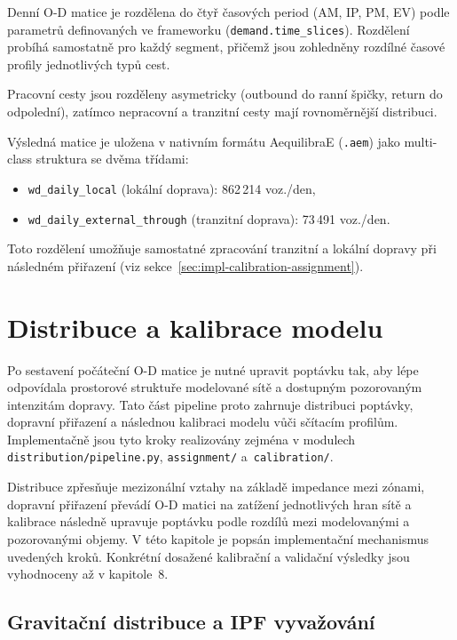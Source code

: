 Denní O-D matice je rozdělena do čtyř časových period (AM, IP, PM, EV) podle parametrů definovaných ve frameworku (\texttt{demand.time\_slices}). Rozdělení probíhá samostatně pro každý segment, přičemž jsou zohledněny rozdílné časové profily jednotlivých typů cest.

Pracovní cesty jsou rozděleny asymetricky (outbound do ranní špičky, return do odpolední), zatímco nepracovní a tranzitní cesty mají rovnoměrnější distribuci.

Výsledná matice je uložena v nativním formátu AequilibraE (\texttt{.aem}) jako multi-class struktura se dvěma třídami:
\begin{itemize}
    \item \texttt{wd\_daily\_local} (lokální doprava): 862\,214 voz./den,
    \item \texttt{wd\_daily\_external\_through} (tranzitní doprava): 73\,491 voz./den.
\end{itemize}

Toto rozdělení umožňuje samostatné zpracování tranzitní a lokální dopravy při následném přiřazení (viz sekce~\ref{sec:impl-calibration-assignment}).


\section{Distribuce a kalibrace modelu}
\label{sec:impl-calibration}

Po sestavení počáteční O-D matice je nutné upravit poptávku tak, aby lépe odpovídala prostorové struktuře modelované sítě a dostupným pozorovaným intenzitám dopravy. Tato část pipeline proto zahrnuje distribuci poptávky, dopravní přiřazení a následnou kalibraci modelu vůči sčítacím profilům. Implementačně jsou tyto kroky realizovány zejména v modulech \texttt{distribution/pipeline.py}, \texttt{assignment/} a~\texttt{calibration/}.

Distribuce zpřesňuje mezizonální vztahy na základě impedance mezi zónami, dopravní přiřazení převádí O-D matici na zatížení jednotlivých hran sítě a kalibrace následně upravuje poptávku podle rozdílů mezi modelovanými a pozorovanými objemy. V této kapitole je popsán implementační mechanismus uvedených kroků. Konkrétní dosažené kalibrační a validační výsledky jsou vyhodnoceny až v kapitole~8.

\subsection{Gravitační distribuce a IPF vyvažování}
\label{sec:impl-calibration-distribution}

